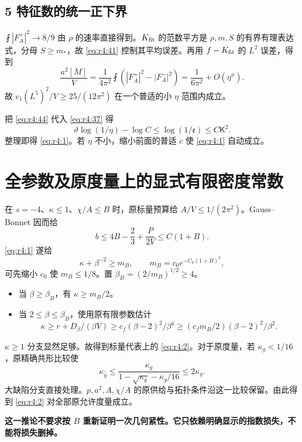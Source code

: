 \documentclass[UTF8,11pt,openany,oneside,fontset=none]{ctexbook}
\providecommand{\tightlist}{\setlength{\itemsep}{1pt}\setlength{\parskip}{0pt}}
\begin{document}
\subsection{5 特征数的统一正下界}\label{ch4:ux7279ux5f81ux6570ux7684ux7edfux4e00ux6b63ux4e0bux754c}

\(\fint|F_A^+|^2\to8/9\) 由 \(\rho\) 的速率直接得到。\(K_{\rm fit}\) 的范数平方是 \(\rho,m,S\) 的有界有理表达式，分母 \(S\ge m_*\)，故 \eqref{eq:r4:41} 控制其平均误差。再用 \(f-K_{\rm fit}\) 的 \(L^2\) 误差，得到 \[
\frac{a^2[M]}V=\frac1{4\pi^2}\fint\left(|F_A^+|^2-|F_A^-|^2\right)
=\frac1{6\pi^2}+O(\eta^\vartheta).
\] 故 \(c_1(L^5)^2/V\ge25/(12\pi^2)\) 在一个普适的小 \(\eta\) 范围内成立。

把 \eqref{eq:r4:44} 代入 \eqref{eq:r4:37} 得 \[
\vartheta\log(1/\eta)-\log C
\le\log(1/\mathfrak e)\le C\mathsf K^2.
\] 整理即得 \eqref{eq:r4:1}。若 \(\eta\) 不小，缩小前面的普适 \(c\) 使 \eqref{eq:r4:1} 自动成立。

\section{全参数及原度量上的显式有限密度常数}\label{ch4:ux5168ux53c2ux6570ux53caux539fux5ea6ux91cfux4e0aux7684ux663eux5f0fux6709ux9650ux5bc6ux5ea6ux5e38ux6570}

在 \(s=-4\)、\(\kappa\le1\)、\(\chi/A\le B\) 时，原标量预算给 \(A/V\le1/(2\pi^2)\)。Gauss--Bonnet 因而给 \[
b\le4B-\frac23+\frac{P}{2V}\le C(1+B).
\] \eqref{eq:r4:1} 遂给 \[
\kappa+\beta^{-2}\ge m_B,
\qquad m_B=c_0e^{-C_0(1+B)^2},
\tag{4.45}\label{eq:r4:45}
\] 可先缩小 \(c_0\) 使 \(m_B\le1/8\)。置 \(\beta_B=(2/m_B)^{1/2}\ge4\)。

\begin{itemize}
\tightlist
\item
  当 \(\beta\ge\beta_B\)，有 \(\kappa\ge m_B/2\)。
\item
  当 \(2\le\beta\le\beta_B\)，使用原有限参数估计 \[
  \kappa\ge r+D_\beta/(\beta V)
  \ge c_f(\beta-2)^2/\beta^4
  \ge(c_fm_B/2)(\beta-2)^2/\beta^2.
  \]
\end{itemize}

\(\kappa\ge1\) 分支显然足够。故得到标量代表上的 \eqref{eq:r4:2}。对于原度量，若 \(\kappa_g<1/16\)，原精确共形比较使 \[
\kappa_{\widehat g}\le
\frac{\kappa_g}{1-\sqrt{\kappa_g}-\kappa_g/16}\le2\kappa_g.
\] 大缺陷分支直接处理。\(p,a^2,A,\chi/A\) 的原供给与拓扑条件沿这一比较保留。由此得到 \eqref{eq:r4:2} 对全部原允许度量成立。

\textbf{这一推论不要求按 \(B\) 重新证明一次几何紧性。它只依赖明确显示的指数损失，不能将损失删掉。}
\end{document}
